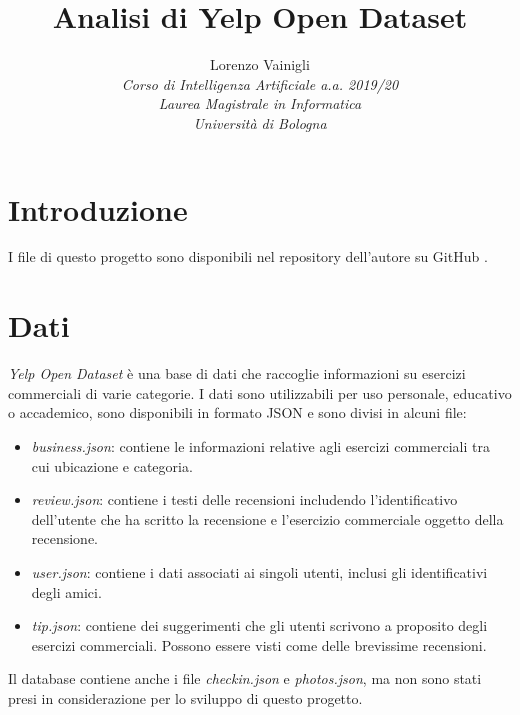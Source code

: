 \documentclass[12pt]{article}
\title{Analisi di Yelp Open Dataset}
\author{
        Lorenzo Vainigli\\
        \textit{\small Corso di Intelligenza Artificiale a.a. 2019/20}\\
        \textit{\small Laurea Magistrale in Informatica}\\
        \textit{\small Università di Bologna}
}
\date{}
\begin{document}
\maketitle

\section{Introduzione}
I file di questo progetto sono disponibili nel repository dell'autore su GitHub \cite{repo}. 

\section{Dati}
\textit{Yelp Open Dataset} \cite{yelp} è una base di dati che raccoglie informazioni su esercizi commerciali di varie categorie. I dati sono utilizzabili per uso personale, educativo o accademico, sono disponibili in formato JSON e sono divisi in alcuni file:
\begin{itemize}
\item \textit{business.json}: contiene le informazioni relative agli esercizi commerciali tra cui ubicazione e categoria.
\item \textit{review.json}: contiene i testi delle recensioni includendo l'identificativo dell'utente che ha scritto la recensione e l'esercizio commerciale oggetto della recensione.
\item \textit{user.json}: contiene i dati associati ai singoli utenti, inclusi gli identificativi degli amici.
\item \textit{tip.json}: contiene dei suggerimenti che gli utenti scrivono a proposito degli esercizi commerciali. Possono essere visti come delle brevissime recensioni.
\end{itemize}
Il database contiene anche i file \textit{checkin.json} e \textit{photos.json}, ma non sono stati presi in considerazione per lo sviluppo di questo progetto.
\end{document}
